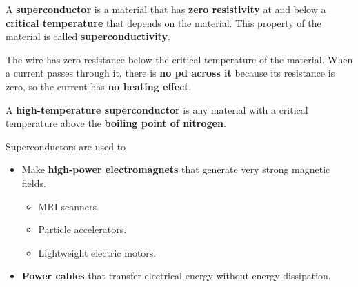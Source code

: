 A \textbf{superconductor} is a material that has \textbf{zero resistivity} at and below a \textbf{critical temperature} that depends on the material. This property of the material is called \textbf{superconductivity}.

The wire has zero resistance below the critical temperature of the material. When a current passes through it, there is \textbf{no pd across it} because its resistance is zero, so the current has \textbf{no heating effect}.

A \textbf{high-temperature superconductor} is any material with a critical temperature above the \textbf{boiling point of nitrogen}.

Superconductors are used to
\begin{itemize}
    \item Make \textbf{high-power electromagnets} that generate very strong magnetic fields.
        \begin{itemize}
            \item MRI scanners.
            \item Particle accelerators.
            \item Lightweight electric motors.
        \end{itemize}
    \item \textbf{Power cables} that transfer electrical energy without energy dissipation.
\end{itemize}
